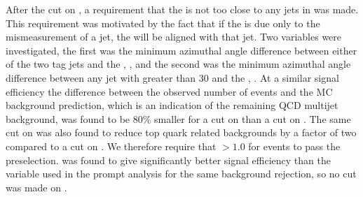 After the cut on \METsig, a requirement that the \METnoMU is not too close to any jets in \phi was made. This requirement was motivated by the fact that if the \MET is due only to the mismeasurement of a jet, the \MET will be aligned with that jet. Two variables were investigated, the first was the minimum azimuthal angle difference between either of the two tag jets and the \METnoMU, \jetmetdphileading, and the second was the minimum azimuthal angle difference between any jet with \pt greater than 30 \GeV and the \METnoMU, \jetmetdphi. At a similar signal efficiency the difference between the observed number of events and the \ac{MC} background prediction, which is an indication of the remaining \ac{QCD} multijet background, was found to be 80\% smaller for a cut on \jetmetdphi than a cut on \jetmetdphileading. The same cut on \jetmetdphi was also found to reduce top quark related backgrounds by a factor of two compared to a cut on \jetmetdphileading. We therefore require that \jetmetdphi$>1.0$ for events to pass the preselection. \jetmetdphi was found to give significantly better signal efficiency than the \dphijj variable used in the prompt analysis for the same background rejection, so no cut was made on \dphijj.

